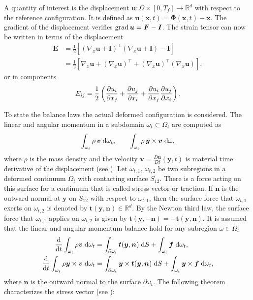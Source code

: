 A quantity of interest is the displacement $\bm{u}: \Omega \times [0, T_f] \rightarrow \mathbb{R}^d$ with respect to the reference configuration. It is defined as $\bm{u}(\bm{x}, t) = \bm{\Phi}(\bm{x}, t) - \bm{x}$. The gradient of the displacement verifies $\operatorname*{grad}\bm{u} = \bm{F} - \bm{I}$. The strain tensor can now be written in terms of the displacement
\begin{equation*}
\begin{aligned}
\bm{E} &= \frac{1}{2}\left[(\nabla_x \bm{u} + \bm{I})^\top (\nabla_x \bm{u} + \bm{I}) - \bm{I}\right] \\
&= \frac{1}{2}\left[\nabla_x \bm{u} + (\nabla_x \bm{u})^\top + (\nabla_x \bm{u})^\top (\nabla_x \bm{u})\right],
\end{aligned}
\end{equation*}
or in components \[
E_{ij} = \frac{1}{2} \left(\diffp{u_i}{x_j} + \diffp{u_j}{x_i} + \diffp{u_i}{x_j}\diffp{u_j}{x_i}\right).
\]

To state the balance laws the actual deformed configuration is considered. The linear and angular momentum in a subdomain $\omega_t \subset \Omega_t$ are computed as 
\[
\int_{\omega_t} \rho \, \bm{v} \d{\omega_t}, \qquad \int_{\omega_t} \rho \, \bm{y} \times \bm{v} \d{\omega},
\]
where $\rho$ is the mass density and the velocity $\bm{v} = \frac{D\bm{u}}{Dt}(\bm{y},t)$ is material time derivative of the displacement (see \cite[Chapter 1]{abeyaratne2012notes}).  Let $\omega_{t, 1},\, \omega_{t, 2}$ be two subregions in a deformed continuum $\Omega_t$ with contacting surface $S_{12}$. There is a force acting on this surface for a continuum that is called stress vector or traction. If $\bm{n}$ is the outward normal at $\bm{y}$ on $S_{12}$ with respect to $\omega_{t, 1}$, then the surface force that $\omega_{t, 1}$ exerts on $\omega_{t, 2}$ is denoted by $\bm{t}(\bm{y}, \bm{n}) \in \mathbb{R}^d$. By the Newton third law, the surface force that $\omega_{t, 1}$ applies on $\omega_{t, 2}$ is given by $\bm{t}(\bm{y}, -\bm{n}) = - \bm{t}(\bm{y}, \bm{n})$. It is assumed that the linear and angular momentum balance hold for any subregion $\omega \in \Omega_t$ 
\begin{align*}
	\diff{}{t} \int_{\omega_t} \rho \bm{v} \d{\omega_t} &= \int_{\partial \omega_t} \bm{t}(\bm{y}, \bm{n}) \d{S} + \int_{\omega_t} \bm{f} \d{\omega_t}, \\
	\diff{}{t} \int_{\omega_t} \rho\bm{y} \times \bm{v} \d{\omega_t} &= \int_{\partial \omega_t} \bm{y} \times \bm{t}(\bm{y}, \bm{n}) \d{S} + \int_{\omega_t} \bm{y} \times \bm{f} \d{\omega_t}, \\
\end{align*}
where $\bm{n}$ is the outward normal to the surface $\partial\omega_t$. The following theorem characterizes the stress vector (see \cite[Chapter 2]{ciarlet1988mathematical}):

